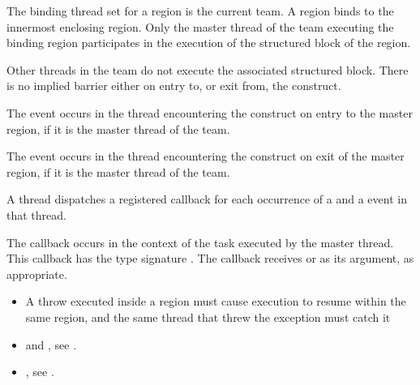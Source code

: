 \binding
The binding thread set for a  region is the current team. A  region 
binds to the innermost enclosing  region. Only the master thread of the team 
executing the binding  region participates in the execution of the structured 
block of the  region.

\descr
Other threads in the team do not execute the associated structured block. There is no 
implied barrier either on entry to, or exit from, the  construct.

\events

The  event occurs in the thread encountering the 
construct on entry to the master region, if it is the master thread of the team.

The  event occurs in the thread encountering the 
construct on exit of the master region, if it is the master thread of the team.

\tools

A thread dispatches a registered 
callback for each occurrence of a  and a
 event in that thread.  

The callback occurs  in the context of the task executed by the master thread.
This callback has the type signature
. The callback receives
 or  
as its  argument, as appropriate.

\restrictions
\begin{cppspecific}
\begin{itemize}
\item A throw executed inside a  region must cause execution to resume within the 
same  region, and the same thread that threw the exception must catch it
\end{itemize}
\end{cppspecific}

\crossreferences
\begin{itemize}

\item {} and , see 
.

\item {}, see
.


\end{itemize}










